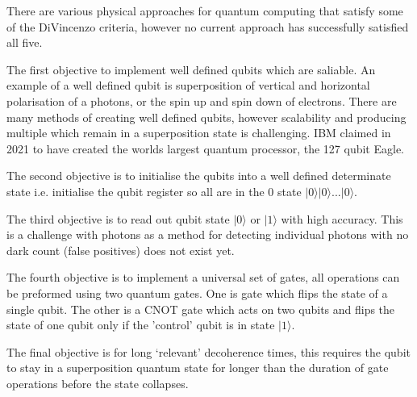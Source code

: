 There are various physical approaches for quantum computing that satisfy some of the DiVincenzo criteria, however no current approach has successfully satisfied all five.
\vspace{1em}

The first objective to implement well defined qubits which are saliable. An example of a well defined qubit is superposition of vertical and horizontal polarisation of a photons, or the spin up and spin down of electrons. 
There are many methods of creating well defined qubits, however scalability and producing multiple which remain in a superposition state is challenging.
IBM claimed in 2021 to have created the worlds largest quantum processor, the 127 qubit Eagle. \cite{authorfullname_ibm_nodate}
\vspace{1em}

The second objective is to initialise the qubits into a well defined determinate state i.e. initialise the qubit register so all are in the 0 state $\vert 0\rangle \vert 0\rangle$...$\vert 0 \rangle$. \cite{lapierre_divincenzo_2021}
\vspace{1em}

The third objective is to read out qubit state $\vert 0\rangle$ or $\vert 1 \rangle$ with high accuracy. 
This is a challenge with photons as a method for detecting individual photons with no dark count (false positives) does not exist yet.
\vspace{1em}

The fourth objective is to implement a universal set of gates, all operations can be preformed using two quantum gates.
One is gate which flips the state of a single qubit. The other is a CNOT gate which acts on two qubits and flips the state of one qubit only if the 'control' qubit is in state $\vert 1 \rangle$. \cite{lapierre_divincenzo_2021} 
\vspace{1em}

The final objective is for long `relevant' decoherence times, this requires the qubit to stay in a superposition quantum state for longer than the duration of gate operations before the state collapses. 
